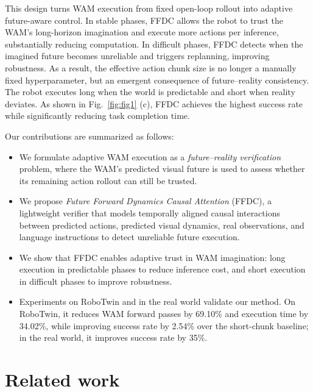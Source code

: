 \documentclass{article}
\begin{document}
This design turns WAM execution from fixed open-loop rollout into adaptive future-aware control. In stable phases, FFDC allows the robot to trust the WAM's long-horizon imagination and execute more actions per inference, substantially reducing computation. In difficult phases, FFDC detects when the imagined future becomes unreliable and triggers replanning, improving robustness. As a result, the effective action chunk size is no longer a manually fixed hyperparameter, but an emergent consequence of future--reality consistency. The robot executes long when the world is predictable and short when reality deviates. As shown in Fig.~\ref{fig:fig1} (c), FFDC achieves the highest success rate while significantly reducing task completion time.

Our contributions are summarized as follows:
\begin{itemize}
    \item We formulate adaptive WAM execution as a \emph{future--reality verification} problem, where the WAM's predicted visual future is used to assess whether its remaining action rollout can still be trusted.
    \item We propose \emph{Future Forward Dynamics Causal Attention} (FFDC), a lightweight verifier that models temporally aligned causal interactions between predicted actions, predicted visual dynamics, real observations, and language instructions to detect unreliable future execution.
    \item We show that FFDC enables adaptive trust in WAM imagination: long execution in predictable phases to reduce inference cost, and short execution in difficult phases to improve robustness.
    \item Experiments on RoboTwin and in the real world validate our method. On RoboTwin, it reduces WAM forward passes by 69.10\% and execution time by 34.02\%, while improving success rate by 2.54\% over the short-chunk baseline; in the real world, it improves success rate by 35\%.
\end{itemize}

\section{Related work}
\end{document}
